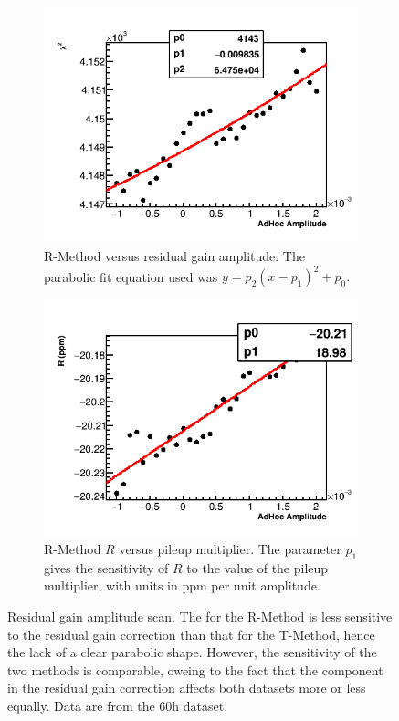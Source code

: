 \begin{figure}[h]
    \begin{subfigure}[t]{0.45\textwidth}
        \centering
        \includegraphics[width=\textwidth]{FullRatio_Chi2_Vs_AdHocAmplitude_Canv}
        \caption{R-Method \chisq versus residual gain amplitude. The parabolic fit equation used was $y = p_{2}(x - p_{1})^{2} + p_{0}.$}
    \end{subfigure}%
    \hspace{1cm}
    \begin{subfigure}[t]{0.45\textwidth}
        \centering
        \includegraphics[width=\textwidth]{FullRatio_R_Vs_AdHocAmplitude_Canv}
        \caption{R-Method $R$ versus pileup multiplier. The parameter $p_{1}$ gives the sensitivity of $R$ to the value of the pileup multiplier, with units in ppm per unit amplitude.}
    \end{subfigure}
\caption[]{Residual gain amplitude scan. The \chisq for the R-Method is less sensitive to the residual gain correction than that for the T-Method, hence the lack of a clear parabolic shape. However, the sensitivity of the two methods is comparable, oweing to the fact that the \wa component in the residual gain correction affects both datasets more or less equally. Data are from the 60h dataset.}
\label{fig:AdHocGainScan}
\end{figure}



